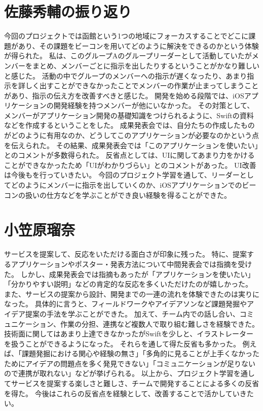\documentclass[openany,11pt,papersize]{jsbook}
\begin{document}
\section{佐藤秀輔の振り返り}
今回のプロジェクトでは函館という1つの地域にフォーカスすることでどこに課題があり、その課題をビーコンを用いてどのように解決をできるのかという体験が得られた。
私は、このグループAのグループリーダーとして活動していたがメンバーをまとめ、メンバーごとに指示を出したりするということがかなり難しいと感じた。
活動の中でグループのメンバーへの指示が遅くなったり、あまり指示を詳しく出すことができなかったことでメンバーの作業が止まってしまうことがあり、指示の伝え方を改善すべきと感じた。
開発を始める段階では、iOSアプリケーションの開発経験を持つメンバーが他にいなかった。
その対策として、メンバーがアプリケーション開発の基礎知識をつけられるように、Swiftの資料などを作成するということをした。
成果発表会では、自分たちの作成したものがどのように有用なのか、どうしてこのアプリケーションが必要なのかという点を伝えられた。
その結果、成果発表会では「このアプリケーションを使いたい」とのコメントが多数得られた。
反省点としては、UIに関してあまり力をかけることができなかったため「UIがわかりづらい」とのコメントがあった。
UI改善は今後もを行っていきたい。
今回のプロジェクト学習を通して、リーダーとしてどのようにメンバーに指示を出していくのか、iOSアプリケーションでのビーコンの扱いの仕方などを学ぶことができ良い経験を得ることができた。


\section{小笠原瑠奈}
サービスを提案して、反応をいただける面白さが印象に残った。
特に、提案するアプリケーションやポスター・発表方法について中間発表会では指摘を受けた。
しかし、成果発表会では指摘もあったが「アプリケーションを使いたい」「分かりやすい説明」などの肯定的な反応を多くいただけたのが嬉しかった。
また、サービスの提案から設計、開発までの一連の流れを体験できたのは実りになった。
具体的に言うと、フィールドワークやアイデアソンなど課題発掘やアイデア提案の手法を学ぶことができた。
加えて、チーム内での話し合い、コミュニケーション、作業の分担、連携など複数人で取り組む難しさを経験できた。
技術面に関してはあまり上達できなかったがSwiftを少しと、イラストレーターを扱うことができるようになった。
それらを通して得た反省も多かった。
例えば、「課題発掘における関心や経験の無さ」「多角的に見ることが上手くなかったためにアイデアの問題点を多く発見できない」「コミュニケーションが足りないので連携が取れない」などが挙げられる。
以上から、プロジェクト学習を通してサービスを提案する楽しさと難しさ、チームで開発することによる多くの反省を得た。
今後はこれらの反省点を経験として、改善することで活かしていきたい。
\end{document}

